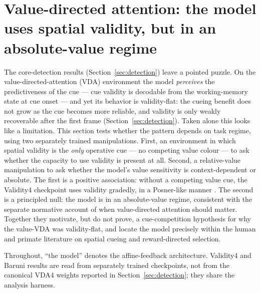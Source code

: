 \section{Value-directed attention: the model uses spatial validity, but
         in an absolute-value regime}
\label{sec:value}

The core-detection results (Section~\ref{sec:detection}) leave a pointed puzzle.
On the value-directed-attention (VDA) environment the model \emph{perceives} the
predictiveness of the cue --- cue validity is decodable from the working-memory
state at cue onset --- and yet its behavior is validity-flat: the cueing benefit
does not grow as the cue becomes more reliable, and validity is only weakly
recoverable after the first frame (Section~\ref{sec:detection}). Taken alone
this looks like a limitation. This section tests whether the pattern depends on
task regime, using two separately trained manipulations. First, an environment in which spatial validity is the \emph{only}
operative cue --- no competing value colour --- to ask whether the capacity to use
validity is present at all. Second, a relative-value manipulation to ask whether
the model's value sensitivity is context-dependent or absolute. The first is a
positive association: without a competing value cue, the Validity4 checkpoint uses validity gradedly,
in a Posner-like manner \cite{posner1980_orienting}. The second is a principled
null: the model is in an absolute-value regime, consistent with the separate normative account
of when value-directed attention should matter. Together they motivate, but do not
prove, a cue-competition hypothesis for why the value-VDA was validity-flat, and
locate the model precisely within the human and primate literature on spatial
cueing and reward-directed selection.

Throughout, ``the model'' denotes the affine-feedback architecture. Validity4 and
Baruni results are read from separately trained checkpoints, not from the canonical
VDA4 weights reported in Section~\ref{sec:detection}; they share the analysis harness.

